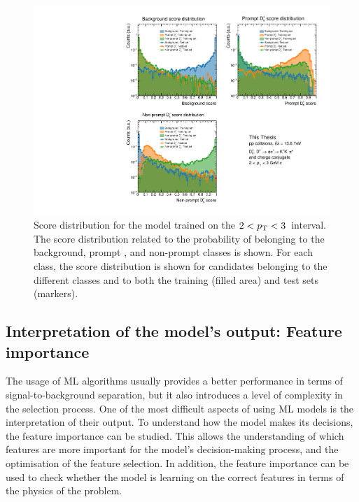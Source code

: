 \begin{figure}[p]
    \centering
    \includegraphics[width=\textwidth]{Figures/Chapter 5/Distributions.pdf}
    \caption{Score distribution for the model trained on the $2<p_\mathrm{T}<3$~\gevc interval. The score distribution related to the probability of belonging to the background, prompt \ds, and non-prompt \ds classes is shown. For each class, the score distribution is shown for candidates belonging to the different classes and to both the training (filled area) and test sets (markers).}
    \label{fig:ml_score}
\end{figure}

\subsection{Interpretation of the model's output: Feature importance}
The usage of ML algorithms usually provides a better performance in terms of signal-to-background separation, but it also introduces a level of complexity in the selection process. One of the most difficult aspects of using ML models is the interpretation of their output. To understand how the model makes its decisions, the feature importance can be studied. This allows the understanding of which features are more important for the model's decision-making process, and the optimisation of the feature selection. In addition, the feature importance can be used to check whether the model is learning on the correct features in terms of the physics of the problem.

